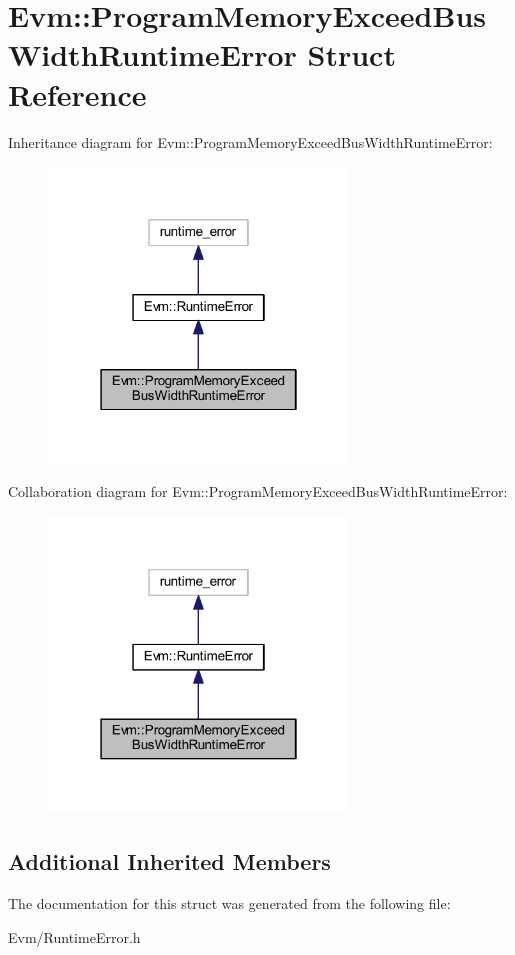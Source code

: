 \hypertarget{struct_evm_1_1_program_memory_exceed_bus_width_runtime_error}{}\section{Evm\+:\+:Program\+Memory\+Exceed\+Bus\+Width\+Runtime\+Error Struct Reference}
\label{struct_evm_1_1_program_memory_exceed_bus_width_runtime_error}


Inheritance diagram for Evm\+:\+:Program\+Memory\+Exceed\+Bus\+Width\+Runtime\+Error\+:
\nopagebreak
\begin{figure}[H]
\begin{center}
\leavevmode
\includegraphics[width=226pt]{struct_evm_1_1_program_memory_exceed_bus_width_runtime_error__inherit__graph}
\end{center}
\end{figure}


Collaboration diagram for Evm\+:\+:Program\+Memory\+Exceed\+Bus\+Width\+Runtime\+Error\+:
\nopagebreak
\begin{figure}[H]
\begin{center}
\leavevmode
\includegraphics[width=226pt]{struct_evm_1_1_program_memory_exceed_bus_width_runtime_error__coll__graph}
\end{center}
\end{figure}
\subsection*{Additional Inherited Members}


The documentation for this struct was generated from the following file\+:\begin{DoxyCompactItemize}
\item 
Evm/Runtime\+Error.\+h\end{DoxyCompactItemize}
